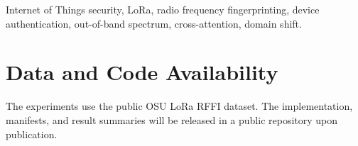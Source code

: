 \documentclass[journal]{IEEEtran}
\begin{document}
\begin{IEEEkeywords}
Internet of Things security, LoRa, radio frequency fingerprinting, device authentication, out-of-band spectrum, cross-attention, domain shift.
\end{IEEEkeywords}










\section*{Data and Code Availability}
The experiments use the public OSU LoRa RFFI dataset. The implementation, manifests, and result summaries will be released in a public repository upon publication.



\end{document}
